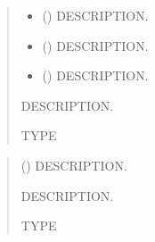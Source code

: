 \documentclass[letterpaper,10pt,english]{sphinxmanual}
\begin{document}
\begin{fulllineitems}
\label{\detokenize{analyzer:ggcas.analyzer.computeError}}
\pysigstartsignatures
{}
\pysigstopsignatures\begin{quote}\begin{description}
\begin{itemize}
\item {} 
\sphinxAtStartPar
{} () \textendash{} DESCRIPTION.

\item {} 
\sphinxAtStartPar
{} () \textendash{} DESCRIPTION.

\item {} 
\sphinxAtStartPar
{} () \textendash{} DESCRIPTION.

\end{itemize}

\sphinxAtStartPar
{} \textendash{} DESCRIPTION.

\sphinxAtStartPar
TYPE

\end{description}\end{quote}

\end{fulllineitems}


\begin{fulllineitems}
\label{\detokenize{analyzer:ggcas.analyzer.densityProfile}}
\pysigstartsignatures
{}
\pysigstopsignatures\begin{quote}\begin{description}
\sphinxAtStartPar
{} () \textendash{} DESCRIPTION.

\sphinxAtStartPar
{} \textendash{} DESCRIPTION.

\sphinxAtStartPar
TYPE

\end{description}\end{quote}

\end{fulllineitems}
\end{document}
